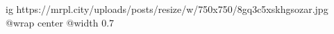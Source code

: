  
 
 
 
 

\ifcmt
  ig https://mrpl.city/uploads/posts/resize/w/750x750/8gq3c5xskhgsozar.jpg
  @wrap center
  @width 0.7
\fi
